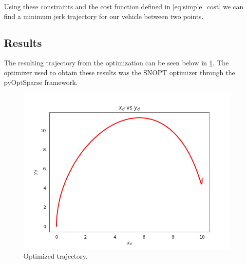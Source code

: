 \documentclass{article}
\begin{document}
Using these constraints and the cost function defined in \cref{eq:simple_cost} we can find a minimum jerk trajectory for our vehicle between two points.

\subsection{Results}
The resulting trajectory from the optimization can be seen below in \cref{fig:plot}. The optimizer used to obtain these results was the SNOPT optimizer through the pyOptSparse framework.

\begin{figure}[bth]
  \centering
  \includegraphics[scale=0.5]{plot.png}
  \caption{Optimized trajectory.\label{fig:plot}}
\end{figure}
\end{document}

